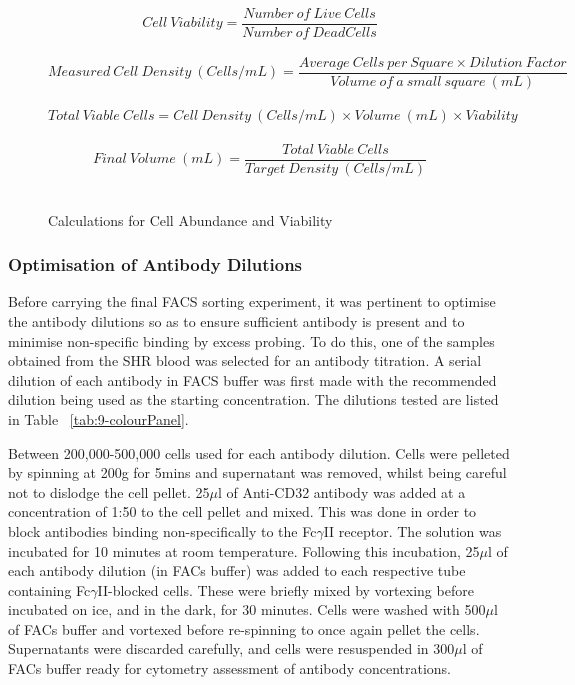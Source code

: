 \begin{figure}[!hbtp]
\[ Cell\ Viability =\frac{Number\ of\ Live\ Cells}{Number\ of\ Dead Cells}\] \\
\[ Measured\ Cell\ Density\ (Cells/mL) =\frac{Average\ Cells\ per\ Square \times Dilution\ Factor}{Volume\ of\ a\ small\ square\ (mL)}\] \\
\[ Total\ Viable\ Cells = Cell\ Density\ (Cells/mL) \times Volume\ (mL) \times Viability\] \\
\[ Final\ Volume\ (mL) =\frac{Total\ Viable\ Cells}{Target\ Density\ (Cells/mL)}\] \\
\caption[Calculations for Cell Abundance and Viability]{Calculations for Cell Abundance and Viability}
\label{cellcount}
\end{figure}


\subsubsection{Optimisation of Antibody Dilutions}

Before carrying the final FACS sorting experiment, it was pertinent to optimise the antibody dilutions so as to ensure sufficient antibody is present and to minimise non-specific binding by excess probing. To do this, one of the samples obtained from the SHR blood was selected for an antibody titration. A serial dilution of each antibody in FACS buffer was first made with the recommended dilution being used as the starting concentration. The dilutions tested are listed in Table ~\ref{tab:9-colourPanel}.

Between 200,000-500,000 cells used for each antibody dilution. Cells were pelleted by spinning at 200g for 5mins and supernatant was removed, whilst being careful not to dislodge the cell pellet. 25$\mu$l of Anti-CD32 antibody was added at a concentration of 1:50 to the cell pellet and mixed. This was done in order to block antibodies binding non-specifically to the Fc$\gamma$II receptor. The solution was incubated for 10 minutes at room temperature. Following this incubation, 25$\mu$l of each antibody dilution (in FACs buffer) was added to each respective tube containing Fc$\gamma$II-blocked cells. These were briefly mixed by vortexing before incubated on ice, and in the dark, for 30 minutes. Cells were washed with 500$\mu$l of FACs buffer and vortexed before re-spinning to once again pellet the cells. Supernatants were discarded carefully, and cells were resuspended in 300$\mu$l of FACs buffer ready for cytometry assessment of antibody concentrations.

